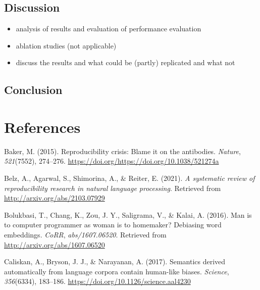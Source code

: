 \documentclass[
  english,
  man,floatsintext]{apa6}
\providecommand{\tightlist}{%
  \setlength{\itemsep}{0pt}\setlength{\parskip}{0pt}}
\begin{document}
\hypertarget{discussion}{%
\subsection{Discussion}\label{discussion}}

\begin{itemize}
\tightlist
\item
  analysis of results and evaluation of performance evaluation
\item
  ablation studies (not applicable)
\item
  discuss the results and what could be (partly) replicated and what not
\end{itemize}

\hypertarget{conclusion}{%
\subsection{Conclusion}\label{conclusion}}

\newpage

\hypertarget{references}{%
\section{References}\label{references}}

\begingroup
\setlength{\parindent}{-0.5in}
\setlength{\leftskip}{0.5in}

\hypertarget{refs}{}
\leavevmode\hypertarget{ref-baker_2015}{}%
Baker, M. (2015). Reproducibility crisis: Blame it on the antibodies. \emph{Nature}, \emph{521}(7552), 274--276. \url{https://doi.org/https://doi.org/10.1038/521274a}

\leavevmode\hypertarget{ref-belz_2021}{}%
Belz, A., Agarwal, S., Shimorina, A., \& Reiter, E. (2021). \emph{A systematic review of reproducibility research in natural language processing}. Retrieved from \url{http://arxiv.org/abs/2103.07929}

\leavevmode\hypertarget{ref-bolukbasi_2016}{}%
Bolukbasi, T., Chang, K., Zou, J. Y., Saligrama, V., \& Kalai, A. (2016). Man is to computer programmer as woman is to homemaker? Debiasing word embeddings. \emph{CoRR}, \emph{abs/1607.06520}. Retrieved from \url{http://arxiv.org/abs/1607.06520}

\leavevmode\hypertarget{ref-caliskan_2017}{}%
Caliskan, A., Bryson, J. J., \& Narayanan, A. (2017). Semantics derived automatically from language corpora contain human-like biases. \emph{Science}, \emph{356}(6334), 183--186. \url{https://doi.org/10.1126/science.aal4230}
\end{document}
